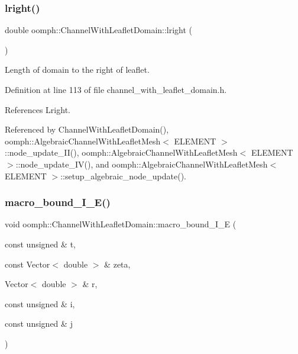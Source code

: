\mbox{\label{classoomph_1_1ChannelWithLeafletDomain_aee74846110e70cd5538386e1ccb0ce7c}} 
\subsubsection{\texorpdfstring{lright()}{lright()}}
{\footnotesize\ttfamily double oomph\+::\+Channel\+With\+Leaflet\+Domain\+::lright (\begin{DoxyParamCaption}{ }\end{DoxyParamCaption})\hspace{0.3cm}{\ttfamily [inline]}}



Length of domain to the right of leaflet. 



Definition at line 113 of file channel\+\_\+with\+\_\+leaflet\+\_\+domain.\+h.



References Lright.



Referenced by Channel\+With\+Leaflet\+Domain(), oomph\+::\+Algebraic\+Channel\+With\+Leaflet\+Mesh$<$ E\+L\+E\+M\+E\+N\+T $>$\+::node\+\_\+update\+\_\+\+I\+I(), oomph\+::\+Algebraic\+Channel\+With\+Leaflet\+Mesh$<$ E\+L\+E\+M\+E\+N\+T $>$\+::node\+\_\+update\+\_\+\+I\+V(), and oomph\+::\+Algebraic\+Channel\+With\+Leaflet\+Mesh$<$ E\+L\+E\+M\+E\+N\+T $>$\+::setup\+\_\+algebraic\+\_\+node\+\_\+update().

\mbox{\label{classoomph_1_1ChannelWithLeafletDomain_ac0bc6edb7d09bfdb310de99f846f5093}} 
\subsubsection{\texorpdfstring{macro\+\_\+bound\+\_\+\+I\+\_\+\+E()}{macro\_bound\_I\_E()}}
{\footnotesize\ttfamily void oomph\+::\+Channel\+With\+Leaflet\+Domain\+::macro\+\_\+bound\+\_\+\+I\+\_\+E (\begin{DoxyParamCaption}\item[{const unsigned \&}]{t,  }\item[{const Vector$<$ double $>$ \&}]{zeta,  }\item[{Vector$<$ double $>$ \&}]{r,  }\item[{const unsigned \&}]{i,  }\item[{const unsigned \&}]{j }\end{DoxyParamCaption})\hspace{0.3cm}{\ttfamily [protected]}}



